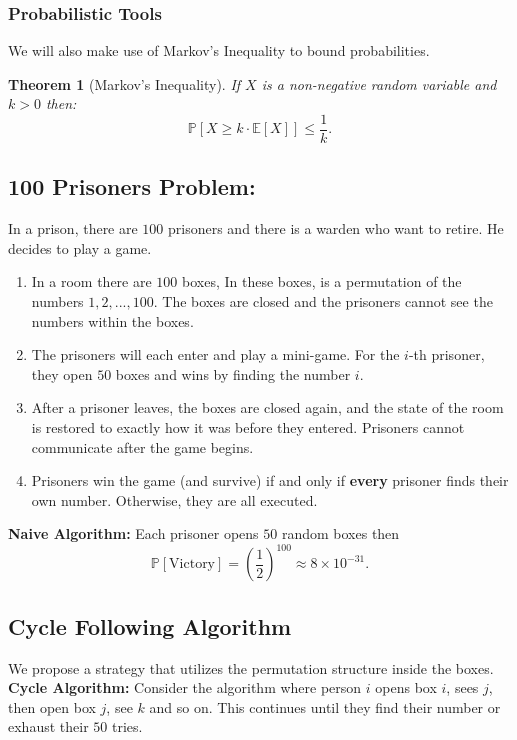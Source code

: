 \documentclass[a4paper]{article}
\newtheorem{thm}{Theorem}[section]
\begin{document}
\subsubsection{Probabilistic Tools}
We will also make use of Markov's Inequality to bound probabilities.

\begin{thm}[Markov's Inequality]
    If $X$ is a non-negative random variable and $k > 0$ then:
    \[
    \mathbb{P}[X\geq k\cdot \mathbb{E}[X]]\leq \frac{1}{k}.
    \] 
\end{thm}
\subsection{100 Prisoners Problem:} In a prison, there are $100$ prisoners and there is a warden who want to retire. He decides to play a game.
    \begin{enumerate}
        \item In a room there are $100$ boxes, In these boxes, is a permutation of the numbers $1,2,...,100$. The boxes are closed and the prisoners cannot see the numbers within the boxes.
        \item The prisoners will each enter and play a mini-game. For the $i$-th prisoner, they open $50$ boxes and wins by finding the number $i$.
        \item After a prisoner leaves, the boxes are closed again, and the state of the room is restored to exactly how it was before they entered. Prisoners cannot communicate after the game begins.
        \item Prisoners win the game (and survive) if and only if \textbf{every} prisoner finds their own number. Otherwise, they are all executed.
    \end{enumerate}
\noindent \textbf{Naive Algorithm:} Each prisoner opens $50$ random boxes then \[
\mathbb{P}[\text{Victory}] = \left(\frac{1}{2}\right)^{100} \approx 8 \times 10^{-31}.
\]
\subsection{Cycle Following Algorithm}

We propose a strategy that utilizes the permutation structure inside the boxes.\\
\textbf{Cycle Algorithm:} 
    Consider the algorithm where person $i$ opens box $i$, sees $j$, then open box $j$, see $k$ and so on. This continues until they find their number or exhaust their $50$ tries.
\end{document}
